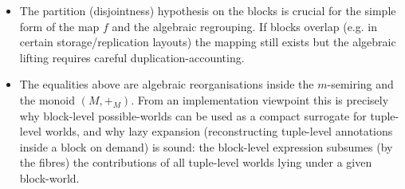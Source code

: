 \begin{remark}

\begin{itemize}
  \item The partition (disjointness) hypothesis on the blocks is crucial for the simple form of the map $f$ and the algebraic regrouping. If blocks overlap (e.g. in certain storage/replication layouts) the mapping still exists but the algebraic lifting requires careful duplication-accounting.
  \item The equalities above are algebraic reorganisations inside the $m$-semiring and the monoid $(M,+_M)$. From an implementation viewpoint this is precisely why block-level possible-worlds can be used as a compact surrogate for tuple-level worlds, and why lazy expansion (reconstructing tuple-level annotations inside a block on demand) is sound: the block-level expression subsumes (by the fibres) the contributions of all tuple-level worlds lying under a given block-world.
\end{itemize}
\end{remark}
